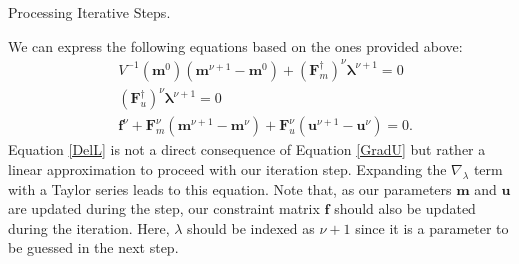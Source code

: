 \documentclass[
	xcolor=dvipsnames,
	10pt, 
	]{beamer}
\begin{document}
\begin{frame}{Processing Iterative Steps.}
	\begin{block}{}
		We can express the following equations based on the ones provided above:
		\begin{align}
			&V^{-1}(\mathbf m^0)(\mathbf{m}^{\nu+1}-\mathbf{m}^0)+(\mathbf{F}_m^\dagger)^\nu\mathbf\lambda^{\nu+1}=0\label{DelM}\\
			&(\mathbf{F}_u^\dagger)^\nu\mathbf\lambda^{\nu+1}=0\label{DelU}\\
			&\mathbf f^\nu + \mathbf F^\nu_m (\mathbf m^{\nu+1}-\mathbf m^\nu) + \mathbf F^\nu_u(\mathbf u^{\nu+1}-\mathbf u^\nu)=0\label{DelL}.
		\end{align}
		Equation \eqref{DelL} is not a direct consequence of Equation \eqref{GradU} but rather a linear approximation to proceed with our iteration step. Expanding the $\nabla_\lambda$ term with a Taylor series leads to this equation. 
		Note that, as our parameters $\mathbf m$ and $\mathbf u$ are updated during the step, our constraint matrix $\mathbf f$ should also be updated during the iteration. Here, $\lambda$ should be indexed as $\nu+1$ since it is a parameter to be guessed in the next step.
	\end{block}
\end{frame}
\end{document}
